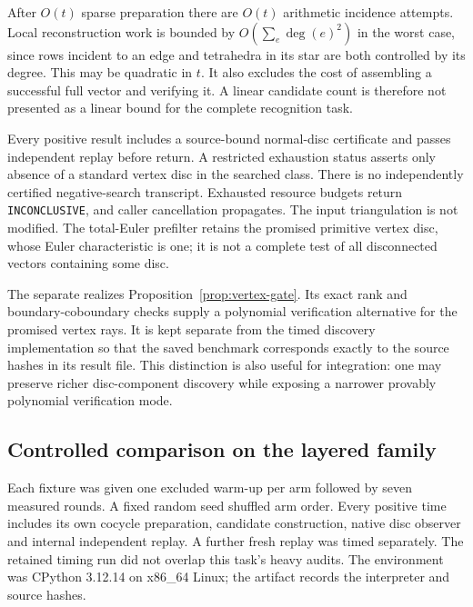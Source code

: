 After $O(t)$ sparse preparation there are $O(t)$ arithmetic incidence
attempts. Local reconstruction work is bounded by
$O(\sum_e\deg(e)^2)$ in the worst case, since rows incident to an edge
and tetrahedra in its star are both controlled by its degree. This may be
quadratic in $t$. It also excludes the cost of assembling a successful
full vector and verifying it. A linear candidate count is therefore not
presented as a linear bound for the complete recognition task.

Every positive result includes a source-bound normal-disc certificate
and passes independent replay before return. A restricted exhaustion
status asserts only absence of a standard vertex disc in the searched
class. There is no independently certified negative-search transcript.
Exhausted resource budgets return \texttt{INCONCLUSIVE}, and caller
cancellation propagates. The input triangulation is not modified.
The total-Euler prefilter retains the promised primitive vertex disc,
whose Euler characteristic is one; it is not a complete test of all
disconnected vectors containing some disc.

The separate  realizes
Proposition~\ref{prop:vertex-gate}. Its exact rank and boundary-coboundary
checks supply a polynomial verification alternative for the promised
vertex rays. It is kept separate from the timed discovery implementation
so that the saved benchmark corresponds exactly to the source hashes in
its result file. This distinction is also useful for integration: one may
preserve richer disc-component discovery while exposing a narrower
provably polynomial verification mode.

\subsection{Controlled comparison on the layered family}

Each fixture was given one excluded warm-up per arm followed by seven
measured rounds. A fixed random seed shuffled arm order. Every positive
time includes its own cocycle preparation, candidate construction, native
disc observer and internal independent replay. A further fresh replay was
timed separately. The retained timing run did not overlap this task's
heavy audits. The environment was CPython 3.12.14 on x86\_64 Linux;
the artifact records the interpreter and source hashes.


